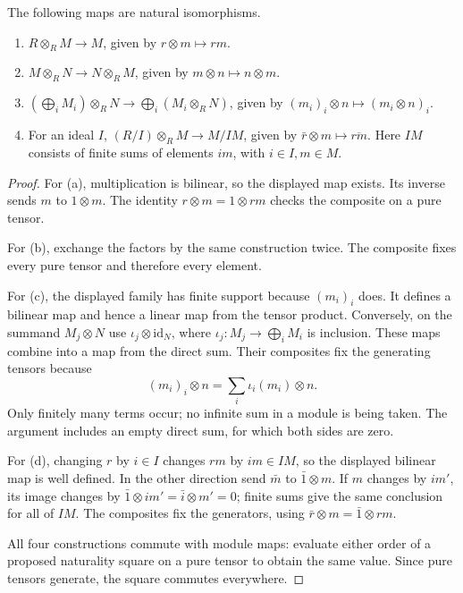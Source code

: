 \begin{proposition}\label{prop:tensorrules}
The following maps are natural isomorphisms.
\begin{enumerate}[label=(\alph*)]
\item $R\otimes_R M\to M$, given by $r\otimes m\mapsto rm$.
\item $M\otimes_RN\to N\otimes_RM$, given by $m\otimes n\mapsto n\otimes m$.
\item $(\bigoplus_iM_i)\otimes_RN\to\bigoplus_i(M_i\otimes_RN)$, given by $(m_i)_i\otimes n\mapsto(m_i\otimes n)_i$.
\item For an ideal $I$, $(R/I)\otimes_RM\to M/IM$, given by $\bar r\otimes m\mapsto\overline{rm}$. Here $IM$ consists of finite sums of elements $im$, with $i\in I,m\in M$.
\end{enumerate}
\end{proposition}

\begin{proof}
For (a), multiplication is bilinear, so the displayed map exists. Its inverse sends $m$ to $1\otimes m$. The identity $r\otimes m=1\otimes rm$ checks the composite on a pure tensor.

For (b), exchange the factors by the same construction twice. The composite fixes every pure tensor and therefore every element.

For (c), the displayed family has finite support because $(m_i)_i$ does. It defines a bilinear map and hence a linear map from the tensor product. Conversely, on the summand $M_j\otimes N$ use $\iota_j\otimes\mathrm{id}_N$, where $\iota_j\colon M_j\to\bigoplus_iM_i$ is inclusion. These maps combine into a map from the direct sum. Their composites fix the generating tensors because
\[
(m_i)_i\otimes n=\sum_i\iota_i(m_i)\otimes n.
\]
Only finitely many terms occur; no infinite sum in a module is being taken. The argument includes an empty direct sum, for which both sides are zero.

For (d), changing $r$ by $i\in I$ changes $rm$ by $im\in IM$, so the displayed bilinear map is well defined. In the other direction send $\bar m$ to $\bar1\otimes m$. If $m$ changes by $im'$, its image changes by
$\bar1\otimes im'=\bar i\otimes m'=0$; finite sums give the same conclusion for all of $IM$. The composites fix the generators, using $\bar r\otimes m=\bar1\otimes rm$.

All four constructions commute with module maps: evaluate either order of a proposed naturality square on a pure tensor to obtain the same value. Since pure tensors generate, the square commutes everywhere.
\end{proof}

